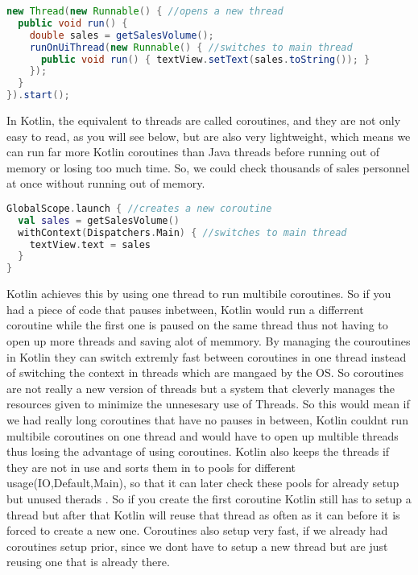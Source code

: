 \documentclass[a4paper,11pt]{article}
\begin{document}
\begin{lstlisting}[language=Java, title={Java Background Threads}]
new Thread(new Runnable() { //opens a new thread
  public void run() {
    double sales = getSalesVolume();
    runOnUiThread(new Runnable() { //switches to main thread
      public void run() { textView.setText(sales.toString()); }
    });
  }
}).start();
\end{lstlisting}
In Kotlin, the equivalent to threads are called coroutines, and they are not only easy to read, as you will see below, but are also very lightweight, which means we can run far more Kotlin coroutines than Java threads before running out of memory or losing too much time.
So, we could check thousands of sales personnel at once without running out of memory.
\begin{lstlisting}[language = Kotlin, title = Kotlin Coroutines]
GlobalScope.launch { //creates a new coroutine
  val sales = getSalesVolume() 
  withContext(Dispatchers.Main) { //switches to main thread
    textView.text = sales 
  }
}
\end{lstlisting}
Kotlin achieves this by using one thread to run multibile coroutines. So if you had a piece of code that pauses inbetween, Kotlin would run a differrent coroutine while the first one is paused on the same thread thus not having to open up more threads and saving alot of memmory. By managing the couroutines in Kotlin they can switch extremly fast between coroutines in one thread instead of switching the context in threads which are mangaed by the OS. So coroutines are not really a new version of threads but a system that cleverly manages the resources given to minimize the unnesesary use of Threads. So this would mean if we had really long coroutines that have no pauses in between, Kotlin couldnt run multibile coroutines on one thread and would have to open up multible threads thus losing the advantage of using coroutines. Kotlin also keeps the threads if they are not in use and sorts them in to pools for different usage(IO,Default,Main), so that it can later check these pools for already setup but unused therads . So if you create the first coroutine Kotlin still has to setup a thread but after that Kotlin will reuse that thread as often as it can before it is forced to create a new one. Coroutines also setup very fast, if we already had coroutines setup prior, since we dont have to setup a new thread but are just reusing one that is already there.
\end{document}
